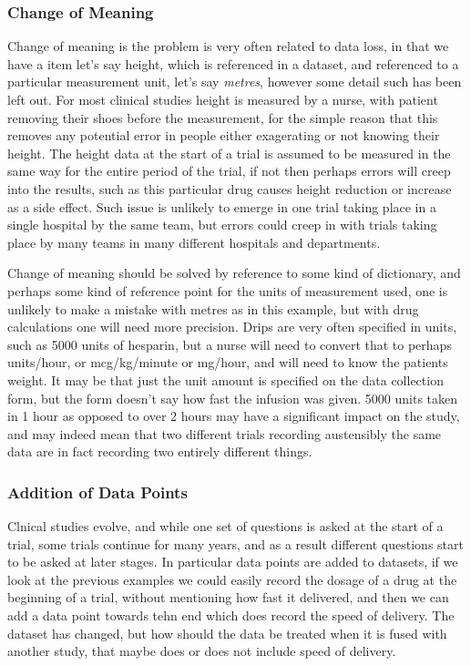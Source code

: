 \documentclass[a4paper,twoside]{article}
\begin{document}
\subsubsection{Change of Meaning}

Change of meaning is the problem is very often related to data loss, in that we have a item let's say height, which is referenced in a dataset, and referenced to a particular measurement unit, let's say \emph{metres}, however some detail such has been left out. For most clinical studies height is measured by a nurse, with patient removing their shoes before the measurement, for the simple reason that this removes any potential error in people either exagerating or not knowing their height. The height data at the start of a trial is assumed to be measured in the same way for the entire period of the trial, if not then perhaps errors will creep into the results, such as this particular drug causes height reduction or increase as a side effect. Such issue is unlikely to emerge in one trial taking place in a single hospital by the same team, but errors could creep in with trials taking place by many teams in many different hospitals and departments.

Change of meaning should be solved by reference to some kind of dictionary, and perhaps some kind of reference point for the units of measurement used, one is unlikely to make a mistake with metres as in this example, but with drug calculations one will need more precision. Drips are very often specified in units, such as 5000 units of hesparin, but a nurse will need to convert that to perhaps units/hour, or mcg/kg/minute or mg/hour, and will need to know the patients weight. It may be that just the unit amount is specified on the data collection form, but the form doesn't say how fast the infusion was given. 5000 units taken in 1 hour as opposed to over 2 hours may have a significant impact on the study, and may indeed mean that two different trials recording austensibly the same data are in fact recording two entirely different things.


\subsubsection{Addition of Data Points}
Clnical studies evolve, and while one set of questions is asked at the start of a trial, some trials continue for many years, and as a result different questions start to be asked at later stages. In particular data points are added to datasets, if we look at the previous examples we could easily record the dosage of a drug at the beginning of a trial, without mentioning how fast it delivered, and then we can add a data point towards tehn end which does record the speed of delivery. The dataset has changed, but how should the data be treated when it is fused with another study, that maybe does or does not include speed of delivery.
\end{document}
